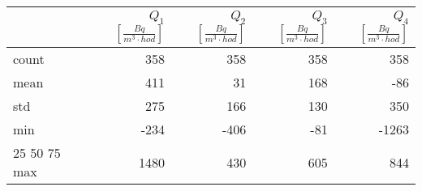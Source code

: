 \begin{tabular}{lrrrr}
\toprule
{} &  $Q_1$ $\left[\si{\frac{Bq}{m^3\cdot hod}}\right]$ &  $Q_2$ $\left[\si{\frac{Bq}{m^3\cdot hod}}\right]$ &  $Q_3$ $\left[\si{\frac{Bq}{m^3\cdot hod}}\right]$ &  $Q_4$ $\left[\si{\frac{Bq}{m^3\cdot hod}}\right]$ \\
\midrule
count &                                                358 &                                                358 &                                                358 &                                                358 \\
mean  &                                                411 &                                                 31 &                                                168 &                                                -86 \\
std   &                                                275 &                                                166 &                                                130 &                                                350 \\
min   &                                               -234 &                                               -406 &                                                -81 &                                              -1263 \\
25%
50%
75%
max   &                                               1480 &                                                430 &                                                605 &                                                844 \\
\bottomrule
\end{tabular}

